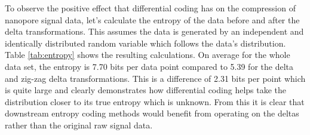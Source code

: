 

To observe the positive effect that differential coding has on the compression
of nanopore signal data, let's calculate the entropy of the data before and
after the delta transformations. This assumes the data is generated by an
independent and identically distributed random variable which follows the data's
distribution. Table \ref{tab:entropy} shows the resulting calculations. On
average for the whole data set, the entropy is 7.70 bits per data point compared
to 5.39 for the delta and zig-zag delta transformations. This is a difference of
2.31 bits per point which is quite large and clearly demonstrates how
differential coding helps take the distribution closer to its true entropy which
is unknown. From this it is clear that downstream entropy coding methods would
benefit from operating on the deltas rather than the original raw signal data.




